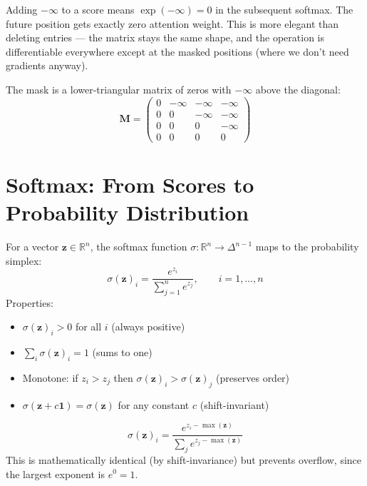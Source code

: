 \documentclass[11pt, a4paper]{article}
\newcommand{\R}{\mathbb{R}}
\begin{document}
\begin{intuition}
Adding $-\infty$ to a score means $\exp(-\infty) = 0$ in the subsequent softmax.
The future position gets exactly zero attention weight. This is more elegant than
deleting entries --- the matrix stays the same shape, and the operation is differentiable
everywhere except at the masked positions (where we don't need gradients anyway).

The mask is a lower-triangular matrix of zeros with $-\infty$ above the diagonal:
\[
\bm{M} = \begin{pmatrix}
0 & -\infty & -\infty & -\infty \\
0 & 0 & -\infty & -\infty \\
0 & 0 & 0 & -\infty \\
0 & 0 & 0 & 0
\end{pmatrix}
\]
\end{intuition}

\section{Softmax: From Scores to Probability Distribution}

\begin{formaldef}
For a vector $\bm{z} \in \R^n$, the softmax function $\sigma: \R^n \to \Delta^{n-1}$
maps to the probability simplex:
\[
\sigma(\bm{z})_i = \frac{e^{z_i}}{\sum_{j=1}^{n} e^{z_j}}, \qquad i = 1, \ldots, n
\]
Properties:
\begin{itemize}[nosep]
  \item $\sigma(\bm{z})_i > 0$ for all $i$ (always positive)
  \item $\sum_i \sigma(\bm{z})_i = 1$ (sums to one)
  \item Monotone: if $z_i > z_j$ then $\sigma(\bm{z})_i > \sigma(\bm{z})_j$ (preserves order)
  \item $\sigma(\bm{z} + c\bm{1}) = \sigma(\bm{z})$ for any constant $c$ (shift-invariant)
\end{itemize}
\end{formaldef}

\begin{formaldef}
\[
\sigma(\bm{z})_i = \frac{e^{z_i - \max(\bm{z})}}{\sum_{j} e^{z_j - \max(\bm{z})}}
\]
This is mathematically identical (by shift-invariance) but prevents overflow,
since the largest exponent is $e^0 = 1$.
\end{formaldef}
\end{document}
